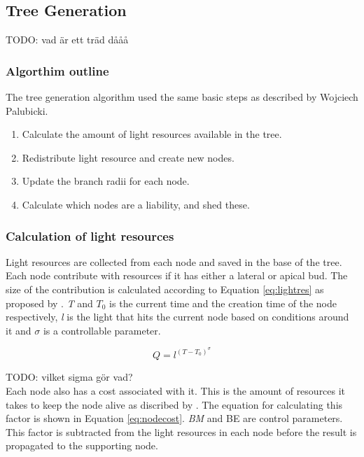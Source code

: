 \documentclass{article}
\begin{document}
  		\subsection{Tree Generation}
  			
  			TODO: vad är ett träd dååå
  			
  			\subsubsection*{Algorthim outline}
  			
  			The tree generation algorithm used the same basic steps as described by Wojciech Palubicki. \citep{palubicki2009self}
  			
  			\begin{enumerate}
  				\item Calculate the amount of light resources available in the tree.
  				\item Redistribute light resource and create new nodes.
  				\item Update the branch radii for each node.
  				\item Calculate which nodes are a liability, and shed these.
  			\end{enumerate}
  		
  			\subsubsection*{Calculation of light resources}
  			
  				Light resources are collected from each node and saved in the base of the tree. Each node contribute with resources if it has either a lateral or apical bud. The size of the contribution is calculated according to Equation \ref{eq:lightres} as proposed by \cite{yi2018tree}. \textit{T} and \textit{$T_0$} is the current time and the creation time of the node respectively, \textit{l} is the light that hits the current node based on conditions around it and $\sigma$ is a controllable parameter.
  				
  				\begin{equation}
  					\label{eq:lightres}
  					Q = l^{{(T-T_0)}^\sigma}
  				\end{equation}
  				
  				TODO: vilket sigma gör vad? \\
  				
  				Each node also has a cost associated with it. This is the amount of resources it takes to keep the node alive as discribed by \cite{mvech1996visual}. The equation for calculating this factor is shown in Equation \ref{eq:nodecost}. \textit{BM} and BE are control parameters. This factor is subtracted from the light resources in each node before the result is propagated to the supporting node. 
  				
\end{document}
